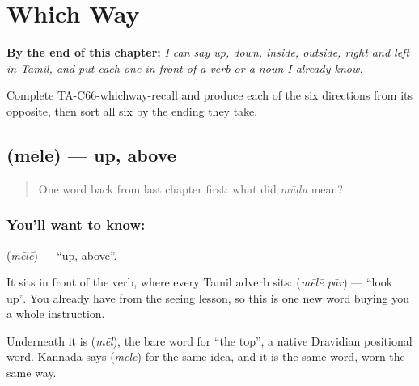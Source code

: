 
\chapter{Which Way}
\label{ch:ta-which-way}

\begin{chapteropening}
\textbf{By the end of this chapter:} \emph{I can say up, down, inside, outside, right and left in Tamil, and put each one in front of a verb or a noun I already know.}

Complete TA-C66-whichway-recall and produce each of the six directions from its opposite, then sort all six by the ending they take.
\end{chapteropening}

\section[\texorpdfstring{\ta{மேலே} (mēlē)}{மேலே (mēlē)}]{ (mēlē) — up, above}

\label{lesson:TA-C66-up}



\begin{quote}
One word back from last chapter first: what did \emph{mūḍu} mean?
\end{quote}

\subsection*{You'll want to know: }
\textbf{} (\emph{mēlē}) — \textquotedblleft{}up, above\textquotedblright{}.

It sits in front of the verb, where every Tamil adverb sits: \textbf{ } (\emph{mēlē pār}) — \textquotedblleft{}look up\textquotedblright{}. You already have  from the seeing lesson, so this is one new word buying you a whole instruction.

Underneath it is \textbf{} (\emph{mēl}), the bare word for \textquotedblleft{}the top\textquotedblright{}, a native Dravidian positional word. Kannada says \textbf{} (\emph{mēle}) for the same idea, and it is the same word, worn the same way.

